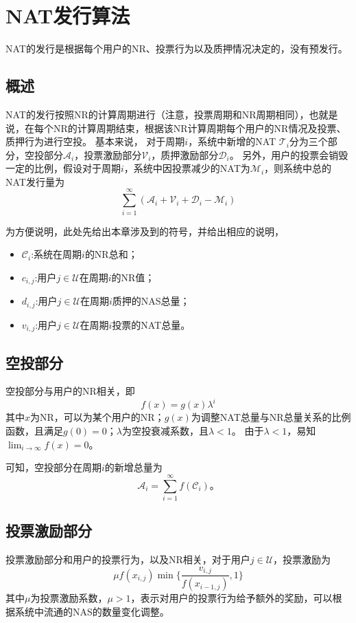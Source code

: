 
\section{NAT发行算法}

NAT的发行是根据每个用户的NR、投票行为以及质押情况决定的，没有预发行。

\subsection{概述}
NAT的发行按照NR的计算周期进行（注意，投票周期和NR周期相同），也就是说，在每个NR的计算周期结束，根据该NR计算周期每个用户的NR情况及投票、质押行为进行空投。
基本来说，
对于周期$i$，系统中新增的NAT $\mathcal{T}_i$分为三个部分，空投部分$\mathcal{A}_i$，投票激励部分$\mathcal{V}_i$，质押激励部分$\mathcal{D}_i$。
另外，用户的投票会销毁一定的比例，假设对于周期$i$，系统中因投票减少的NAT为$\mathcal{M}_i$，则系统中总的NAT发行量为
\[
\sum_{i=1}^{\infty} (\mathcal{A}_i + \mathcal{V}_i + \mathcal{D}_i - \mathcal{M}_i)
\]

为方便说明，此处先给出本章涉及到的符号，并给出相应的说明，
\begin{itemize}
\item $\mathcal{C}_i$:系统在周期$i$的NR总和；
\item $c_{i,j}$:用户$j \in \mathcal{U}$在周期$i$的NR值；
\item $d_{i,j}$:用户$j \in \mathcal{U}$在周期$i$质押的NAS总量；
\item $v_{i,j}$:用户$j \in \mathcal{U}$在周期$i$投票的NAT总量。
\end{itemize}

\subsection{空投部分}
空投部分与用户的NR相关，即
\[
    f(x) = g(x)\lambda^i
\]
\noindent 其中$x$为NR，可以为某个用户的NR；$g(x)$为调整NAT总量与NR总量关系的比例函数，且满足$g(0) = 0$；$\lambda$为空投衰减系数，且$\lambda < 1$。
由于$\lambda < 1$，易知$\lim_{i\to \infty}f(x) = 0$。

可知，空投部分在周期$i$的新增总量为
\[
\mathcal{A}_i = \sum_{i=1}^{\infty}f(\mathcal{C}_i)。
\]

\subsection{投票激励部分}
投票激励部分和用户的投票行为，以及NR相关，对于用户$j \in \mathcal{U}$，投票激励为
\[
\mu f(x_{i,j}) \min\{\frac{v_{i,j}}{f(x_{i-1,j})},1\}
\]
\noindent 其中$\mu$为投票激励系数，$\mu > 1$，表示对用户的投票行为给予额外的奖励，可以根据系统中流通的NAS的数量变化调整。

